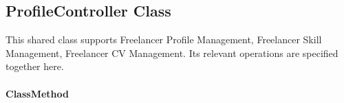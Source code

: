 
\subsection{ProfileController Class}
\label{cls:nhuy-ProfileController}

This shared class supports Freelancer Profile Management, Freelancer Skill Management, Freelancer CV Management. Its relevant operations are specified together here.

\paragraph{ClassMethod}
